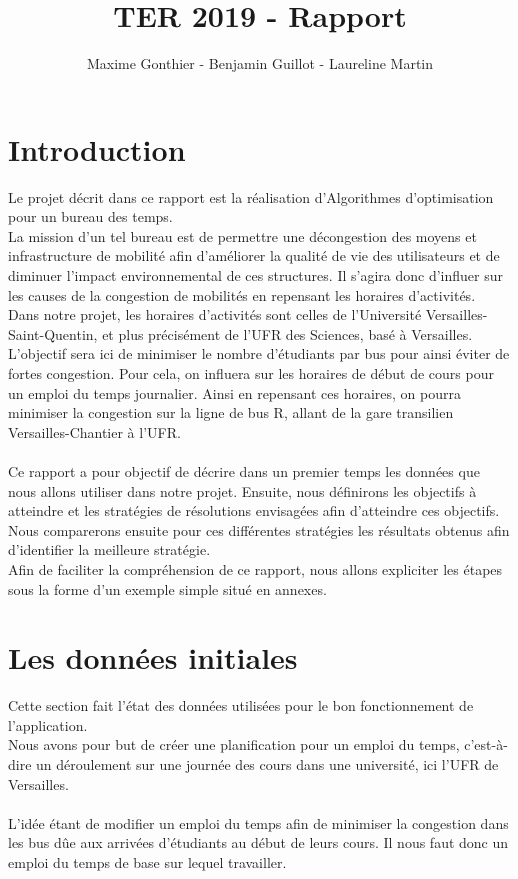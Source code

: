 \documentclass[a4paper,11pt]{article}
\title{TER 2019 - Rapport}
\author{Maxime Gonthier - Benjamin Guillot - Laureline Martin}
\begin{document}
\clearpage
\maketitle

\newpage
\tableofcontents

\newpage
\section{Introduction}
	Le projet décrit dans ce rapport est la réalisation d'Algorithmes d'optimisation pour un bureau des temps.\\
	La mission d'un tel bureau est de permettre une décongestion des moyens et infrastructure de mobilité afin d'améliorer la qualité de vie des utilisateurs et de diminuer l'impact environnemental de ces structures. Il s'agira donc d'influer sur les causes de la congestion de mobilités en repensant les horaires d'activités.\\
	Dans notre projet, les horaires d'activités sont celles de l'Université Versailles-Saint-Quentin, et plus précisément de l'UFR des Sciences, basé à Versailles. L'objectif sera ici de minimiser le nombre d'étudiants par bus pour ainsi éviter de fortes congestion. Pour cela, on influera sur les horaires de début de cours pour un emploi du temps journalier. Ainsi en repensant ces horaires, on pourra minimiser la congestion sur la ligne de bus R, allant de la gare transilien Versailles-Chantier à l'UFR.\\
	\\
	Ce rapport a pour objectif de décrire dans un premier temps les données que nous allons utiliser dans notre projet. Ensuite, nous définirons les objectifs à atteindre et les stratégies de résolutions envisagées afin d'atteindre ces objectifs. Nous comparerons ensuite pour ces différentes stratégies les résultats obtenus afin d'identifier la meilleure stratégie.\\
	Afin de faciliter la compréhension de ce rapport, nous allons expliciter les étapes sous la forme d'un exemple simple situé en annexes.
	
	
\section{Les données initiales}
	Cette section fait l'état des données utilisées pour le bon fonctionnement de l'application.\\
	Nous avons pour but de créer une planification pour un emploi du temps, c'est-à-dire un déroulement sur une journée des cours dans une université, ici l'UFR de Versailles.\\
	\\
	L'idée étant de modifier un emploi du temps afin de minimiser la congestion dans les bus dûe aux arrivées d'étudiants au début de leurs cours. Il nous faut donc un emploi du temps de base sur lequel travailler.\\
\end{document}
